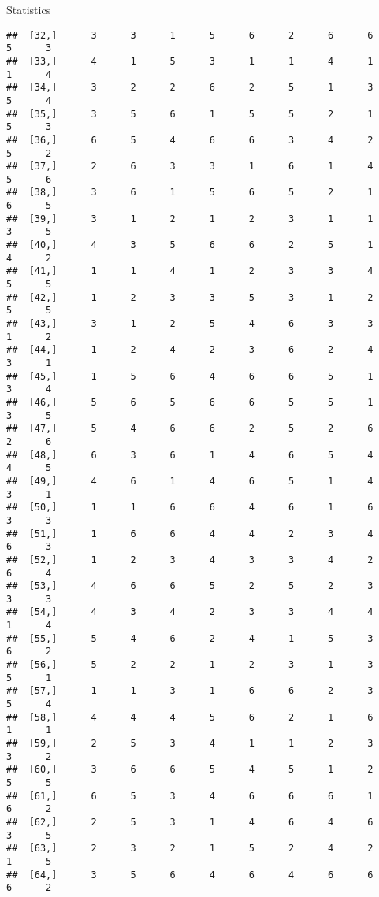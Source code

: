 \documentclass[
  ignorenonframetext,
]{beamer}
\begin{document}
\begin{frame}[fragile]{Statistics}
\begin{verbatim}
##  [32,]      3      3      1      5      6      2      6      6      5      3
##  [33,]      4      1      5      3      1      1      4      1      1      4
##  [34,]      3      2      2      6      2      5      1      3      5      4
##  [35,]      3      5      6      1      5      5      2      1      5      3
##  [36,]      6      5      4      6      6      3      4      2      5      2
##  [37,]      2      6      3      3      1      6      1      4      5      6
##  [38,]      3      6      1      5      6      5      2      1      6      5
##  [39,]      3      1      2      1      2      3      1      1      3      5
##  [40,]      4      3      5      6      6      2      5      1      4      2
##  [41,]      1      1      4      1      2      3      3      4      5      5
##  [42,]      1      2      3      3      5      3      1      2      5      5
##  [43,]      3      1      2      5      4      6      3      3      1      2
##  [44,]      1      2      4      2      3      6      2      4      3      1
##  [45,]      1      5      6      4      6      6      5      1      3      4
##  [46,]      5      6      5      6      6      5      5      1      3      5
##  [47,]      5      4      6      6      2      5      2      6      2      6
##  [48,]      6      3      6      1      4      6      5      4      4      5
##  [49,]      4      6      1      4      6      5      1      4      3      1
##  [50,]      1      1      6      6      4      6      1      6      3      3
##  [51,]      1      6      6      4      4      2      3      4      6      3
##  [52,]      1      2      3      4      3      3      4      2      6      4
##  [53,]      4      6      6      5      2      5      2      3      3      3
##  [54,]      4      3      4      2      3      3      4      4      1      4
##  [55,]      5      4      6      2      4      1      5      3      6      2
##  [56,]      5      2      2      1      2      3      1      3      5      1
##  [57,]      1      1      3      1      6      6      2      3      5      4
##  [58,]      4      4      4      5      6      2      1      6      1      1
##  [59,]      2      5      3      4      1      1      2      3      3      2
##  [60,]      3      6      6      5      4      5      1      2      5      5
##  [61,]      6      5      3      4      6      6      6      1      6      2
##  [62,]      2      5      3      1      4      6      4      6      3      5
##  [63,]      2      3      2      1      5      2      4      2      1      5
##  [64,]      3      5      6      4      6      4      6      6      6      2

\end{verbatim}
\end{frame}
\end{document}
